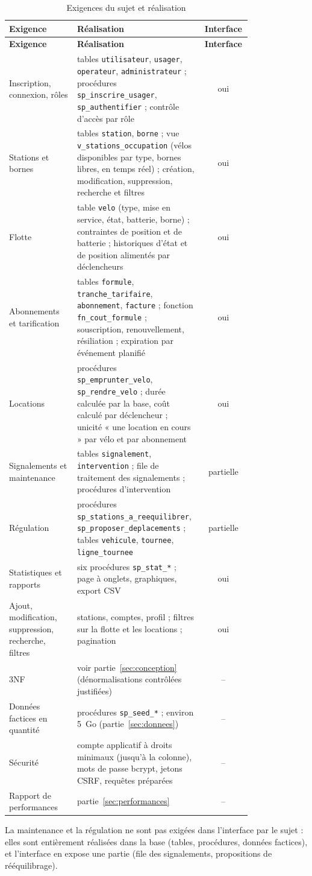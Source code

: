 {\small
\begin{longtable}{>{\raggedright\arraybackslash}p{0.28\linewidth} >{\raggedright\arraybackslash}p{0.52\linewidth} c}
	\caption{Exigences du sujet et réalisation}\label{tab:conformite}\\
	\toprule
	\textbf{Exigence} & \textbf{Réalisation} & \textbf{Interface} \\
	\midrule\endfirsthead
	\toprule
	\textbf{Exigence} & \textbf{Réalisation} & \textbf{Interface} \\
	\midrule\endhead
	Inscription, connexion, rôles & tables \texttt{utilisateur}, \texttt{usager}, \texttt{operateur}, \texttt{administrateur} ; procédures \texttt{sp\_inscrire\_usager}, \texttt{sp\_authentifier} ; contrôle d'accès par rôle & oui \\
	Stations et bornes & tables \texttt{station}, \texttt{borne} ; vue \texttt{v\_stations\_occupation} (vélos disponibles par type, bornes libres, en temps réel) ; création, modification, suppression, recherche et filtres & oui \\
	Flotte & table \texttt{velo} (type, mise en service, état, batterie, borne) ; contraintes de position et de batterie ; historiques d'état et de position alimentés par déclencheurs & oui \\
	Abonnements et tarification & tables \texttt{formule}, \texttt{tranche\_tarifaire}, \texttt{abonnement}, \texttt{facture} ; fonction \texttt{fn\_cout\_formule} ; souscription, renouvellement, résiliation ; expiration par événement planifié & oui \\
	Locations & procédures \texttt{sp\_emprunter\_velo}, \texttt{sp\_rendre\_velo} ; durée calculée par la base, coût calculé par déclencheur ; unicité « une location en cours » par vélo et par abonnement & oui \\
	Signalements et maintenance & tables \texttt{signalement}, \texttt{intervention} ; file de traitement des signalements ; procédures d'intervention & partielle \\
	Régulation & procédures \texttt{sp\_stations\_a\_reequilibrer}, \texttt{sp\_proposer\_deplacements} ; tables \texttt{vehicule}, \texttt{tournee}, \texttt{ligne\_tournee} & partielle \\
	Statistiques et rapports & six procédures \texttt{sp\_stat\_*} ; page à onglets, graphiques, export CSV & oui \\
	Ajout, modification, suppression, recherche, filtres & stations, comptes, profil ; filtres sur la flotte et les locations ; pagination & oui \\
	3NF & voir partie~\ref{sec:conception} (dénormalisations contrôlées justifiées) & -- \\
	Données factices en quantité & procédures \texttt{sp\_seed\_*} ; environ 5~Go (partie~\ref{sec:donnees}) & -- \\
	Sécurité & compte applicatif à droits minimaux (jusqu'à la colonne), mots de passe bcrypt, jetons CSRF, requêtes préparées & -- \\
	Rapport de performances & partie~\ref{sec:performances} & -- \\
	\bottomrule
\end{longtable}
}

La maintenance et la régulation ne sont pas exigées dans l'interface par le sujet : elles sont entièrement réalisées dans la base (tables, procédures, données factices), et l'interface en expose une partie (file des signalements, propositions de rééquilibrage).
